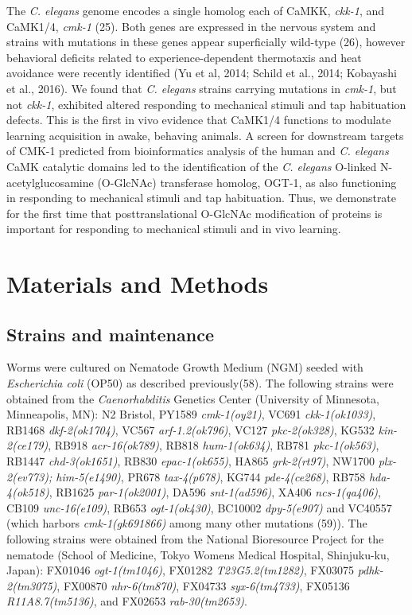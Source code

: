 \documentclass[9pt,twocolumn,twoside]{gsajnl}
\begin{document}
	The \textit{C. elegans} genome encodes a single homolog each of CaMKK, \textit{ckk-1}, and CaMK1/4, \textit{cmk-1} (25). Both genes are expressed in the nervous system and strains with mutations in these genes appear superficially wild-type (26), however behavioral deficits related to experience-dependent thermotaxis and heat avoidance were recently identified (Yu et al, 2014; Schild et al., 2014; Kobayashi et al., 2016). We found that \textit{C. elegans} strains carrying mutations in \textit{cmk-1}, but not \textit{ckk-1}, exhibited altered responding to mechanical stimuli and tap habituation defects. This is the first in vivo evidence that CaMK1/4 functions to modulate learning acquisition in awake, behaving animals. A screen for downstream targets of CMK-1 predicted from bioinformatics analysis of the human and \textit{C. elegans} CaMK catalytic domains led to the identification of the \textit{C. elegans} O-linked N-acetylglucosamine (O-GlcNAc) transferase homolog, OGT-1, as also functioning in responding to mechanical stimuli and tap habituation. Thus, we demonstrate for the first time that posttranslational O-GlcNAc modification of proteins is important for responding to mechanical stimuli and in vivo learning.

\section{Materials and Methods}
\label{sec:materials:methods}

\subsection{Strains and maintenance} 

Worms were cultured on Nematode Growth Medium (NGM) seeded with \textit{Escherichia coli} (OP50) as described previously(58). The following strains were obtained from the \textit{Caenorhabditis} Genetics Center (University of Minnesota, Minneapolis, MN): N2 Bristol, PY1589 \textit{cmk-1(oy21)}, VC691 \textit{ckk-1(ok1033)}, RB1468 \textit{dkf-2(ok1704)}, VC567 \textit{arf-1.2(ok796)}, VC127 \textit{pkc-2(ok328)}, KG532 \textit{kin-2(ce179)}, RB918 \textit{acr-16(ok789)}, RB818 \textit{hum-1(ok634)}, RB781 \textit{pkc-1(ok563)}, RB1447 \textit{chd-3(ok1651)}, RB830 \textit{epac-1(ok655)}, HA865 \textit{grk-2(rt97)}, NW1700 \textit{plx-2(ev773); him-5(e1490)}, PR678 \textit{tax-4(p678)}, KG744 \textit{pde-4(ce268)}, RB758 \textit{hda-4(ok518)}, RB1625 \textit{par-1(ok2001)}, DA596 \textit{snt-1(ad596)}, XA406 \textit{ncs-1(qa406)}, CB109 \textit{unc-16(e109)}, RB653 \textit{ogt-1(ok430)}, BC10002 \textit{dpy-5(e907)} and VC40557 (which harbors \textit{cmk-1(gk691866)} among many other mutations (59)). The following strains were obtained from the National Bioresource Project for the nematode (School of Medicine, Tokyo Womens Medical Hospital, Shinjuku-ku, Japan): FX01046 \textit{ogt-1(tm1046)}, FX01282 \textit{T23G5.2(tm1282)}, FX03075 \textit{pdhk-2(tm3075)}, FX00870 \textit{nhr-6(tm870)}, FX04733 \textit{syx-6(tm4733)}, FX05136 \textit{R11A8.7(tm5136)}, and FX02653 \textit{rab-30(tm2653)}.
\end{document}
